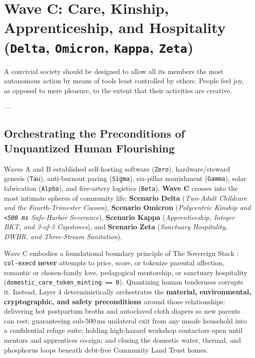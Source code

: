 \chapter{Wave C: Care, Kinship, Apprenticeship, and Hospitality (\texttt{Delta}, \texttt{Omicron}, \texttt{Kappa}, \texttt{Zeta})}
\label{ch:wave-c}

\epigraph{A convivial society should be designed to allow all its members the most autonomous action by means of tools least controlled by others. People feel joy, as opposed to mere pleasure, to the extent that their activities are creative.}{--- \textcite{illich1973}}

\section{Orchestrating the Preconditions of Unquantized Human Flourishing}
\label{sec:wave-c-intro}

Waves A and B established self-hosting software (\texttt{Zero}), hardware/steward genesis
(\texttt{Tau}), anti-burnout pacing (\texttt{Sigma}), six-pillar nourishment (\texttt{Gamma}),
solar fabrication (\texttt{Alpha}), and five-artery logistics (\texttt{Beta}). \textbf{Wave C}
crosses into the most intimate spheres of community life: \textbf{Scenario Delta}
(\textit{Two-Adult Childcare and the Fourth-Trimester Cocoon}), \textbf{Scenario Omicron}
(\textit{Polycentric Kinship and \texttt{<500 ms} Safe-Harbor Severance}), \textbf{Scenario
Kappa} (\textit{Apprenticeship, Integer BKT, and 3-of-3 Capstones}), and \textbf{Scenario
Zeta} (\textit{Sanctuary Hospitality, DWHR, and Three-Stream Sanitation}).

Wave C embodies a foundational boundary principle of The Sovereign Stack \parencite{kropotkin1902,ostrom1990}:
\texttt{col-execd} \textbf{never} attempts to price, score, or tokenize parental affection,
romantic or chosen-family love, pedagogical mentorship, or sanctuary hospitality
(\texttt{domestic\_care\_token\_minting == 0}). Quantizing human tenderness corrupts it.
Instead, Layer 4 deterministically orchestrates the \textbf{material, environmental, cryptographic,
and safety preconditions} around those relationships: delivering hot postpartum broths and
autoclaved cloth diapers so new parents can rest; guaranteeing sub-$500\,\mathrm{ms}$
unilateral exit from any unsafe household into a confidential refuge suite; holding
high-hazard workshop contactors open until mentors and apprentices co-sign; and closing the
domestic water, thermal, and phosphorus loops beneath debt-free Community Land Trust homes.

